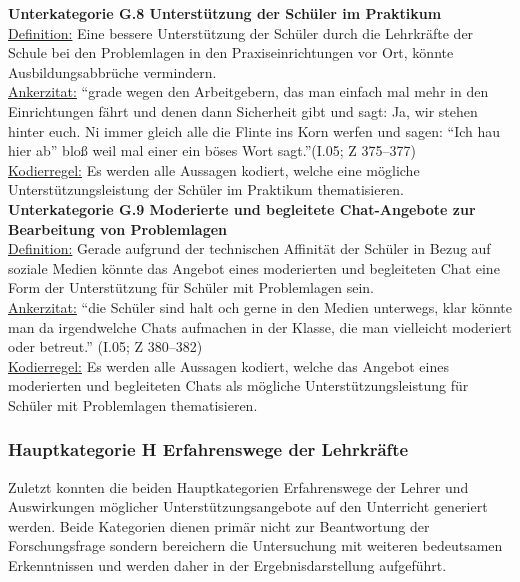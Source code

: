\textbf{Unterkategorie G.8 Unterstützung der Schüler im Praktikum}\\
\underline{Definition:} Eine bessere Unterstützung der Schüler durch die Lehrkräfte der Schule bei den Problemlagen in den Praxiseinrichtungen vor Ort, könnte Ausbildungsabbrüche vermindern.\\
\underline{Ankerzitat:} "`grade wegen den Arbeitgebern, das man einfach mal mehr in den Einrichtungen fährt und denen dann Sicherheit gibt und sagt: Ja, wir stehen hinter euch. Ni immer gleich alle die Flinte ins Korn werfen und sagen: "`Ich hau hier ab"' bloß weil mal einer ein böses Wort sagt."'(I.05; Z 375--377)\\
\underline{Kodierregel:} Es werden alle Aussagen kodiert, welche eine mögliche Unterstützungsleistung der Schüler im Praktikum thematisieren.\\

\textbf{Unterkategorie G.9 Moderierte und begleitete Chat-Angebote zur Bearbeitung von Problemlagen}\\
\underline{Definition:} Gerade aufgrund der technischen Affinität der Schüler in Bezug auf soziale Medien könnte das Angebot eines moderierten und begleiteten Chat eine Form der Unterstützung für Schüler mit Problemlagen sein.\\
\underline{Ankerzitat:} "`die Schüler sind halt och gerne in den Medien unterwegs, klar könnte man da irgendwelche Chats aufmachen in der Klasse, die man vielleicht moderiert oder betreut."' (I.05; Z 380--382)\\
\underline{Kodierregel:} Es werden alle Aussagen kodiert, welche das Angebot eines moderierten und begleiteten Chats als mögliche Unterstützungsleistung für Schüler mit Problemlagen thematisieren.\\

\subsubsection{Hauptkategorie H Erfahrenswege der Lehrkräfte}
\label{sec:HauptkategorieHErfahrenswegeDerLehrkräfte}

Zuletzt konnten die beiden Hauptkategorien Erfahrenswege der Lehrer und Auswirkungen möglicher Unterstützungsangebote auf den Unterricht generiert werden. Beide Kategorien dienen primär nicht zur Beantwortung der Forschungsfrage sondern bereichern die Untersuchung mit weiteren bedeutsamen Erkenntnissen und werden daher in der Ergebnisdarstellung aufgeführt.\\

